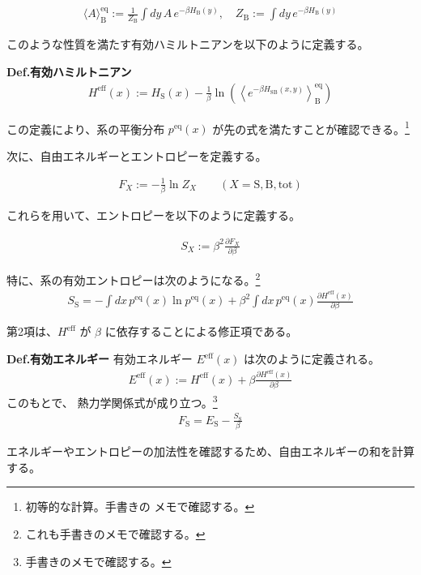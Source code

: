 \documentclass[a4paper,11pt]{jsarticle}
\numberwithin{equation}{section}
\begin{document}
\begin{align}
\langle A \rangle_{\text{B}}^{\mathrm{eq}} := \frac{1}{Z_{\text{B}}} \int dy\, A\, e^{-\beta H_{\text{B}}(y)}, \quad
Z_{\text{B}} := \int dy\, e^{-\beta H_{\text{B}}(y)}
\end{align}

このような性質を満たす有効ハミルトニアンを以下のように定義する。
\begin{itembox}[l]{\textbf{Def.有効ハミルトニアン}}
\begin{align}
H^{\mathrm{eff}}(x) := H_{\text{S}}(x) - \frac{1}{\beta} \ln \left( \left\langle e^{-\beta H_{\text{SB}}(x,y)} \right\rangle_{\text{B}}^{\mathrm{eq}} \right)
\end{align}
\end{itembox}
この定義により、系の平衡分布 $p^{\mathrm{eq}}(x)$ が先の式を満たすことが確認できる。\footnote{初等的な計算。手書きの
メモで確認する。}

次に、自由エネルギーとエントロピーを定義する。

\begin{align}
F_X := - \frac{1}{\beta} \ln Z_X \qquad (X = \text{S}, \text{B}, \text{tot})
\end{align}

これらを用いて、エントロピーを以下のように定義する。

\begin{align}
S_X := \beta^2 \frac{\partial F_X}{\partial \beta}
\end{align}

特に、系の有効エントロピーは次のようになる。\footnote{これも手書きのメモで確認する。}
\begin{align}
S_{\text{S}} = - \int dx\, p^{\mathrm{eq}}(x) \ln p^{\mathrm{eq}}(x)
+ \beta^2 \int dx\, p^{\mathrm{eq}}(x) \frac{\partial H^{\mathrm{eff}}(x)}{\partial \beta}
\end{align}

第2項は、$H^{\mathrm{eff}}$ が $\beta$ に依存することによる修正項である。

\begin{itembox}[l]{\textbf{Def.有効エネルギー}}
有効エネルギー $E^{\mathrm{eff}}(x)$ は次のように定義される。
\begin{align}
E^{\mathrm{eff}}(x) := H^{\mathrm{eff}}(x) + \beta \frac{\partial H^{\mathrm{eff}}(x)}{\partial \beta}
\end{align}
このもとで、
熱力学関係式が成り立つ。\footnote{手書きのメモで確認する。}
\begin{align}
F_{\text{S}} = E_{\text{S}} - \frac{S_{\text{S}}}{\beta}
\end{align}
\end{itembox}
エネルギーやエントロピーの加法性を確認するため、自由エネルギーの和を計算する。
\end{document}
